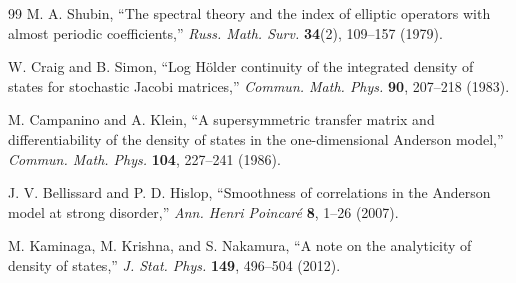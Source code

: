 \documentclass[12pt,a4paper]{article}
\numberwithin{equation}{section}
\begin{document}
\begin{thebibliography}{99}
M. A. Shubin,
``The spectral theory and the index of elliptic operators with almost periodic
coefficients,''
\textit{Russ. Math. Surv.} {\bfseries 34}(2), 109--157 (1979).

W. Craig and B. Simon,
``Log H\"older continuity of the integrated density of states for stochastic
Jacobi matrices,''
\textit{Commun. Math. Phys.} {\bfseries 90}, 207--218 (1983).

M. Campanino and A. Klein,
``A supersymmetric transfer matrix and differentiability of the density of
states in the one-dimensional Anderson model,''
\textit{Commun. Math. Phys.} {\bfseries 104}, 227--241 (1986).

J. V. Bellissard and P. D. Hislop,
``Smoothness of correlations in the Anderson model at strong disorder,''
\textit{Ann. Henri Poincar\'e} {\bfseries 8}, 1--26 (2007).

M. Kaminaga, M. Krishna, and S. Nakamura,
``A note on the analyticity of density of states,''
\textit{J. Stat. Phys.} {\bfseries 149}, 496--504 (2012).

\end{thebibliography}
\endgroup
\end{document}
